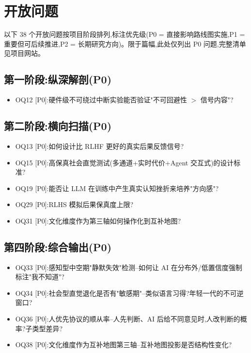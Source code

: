 \documentclass[11pt,a4paper]{article}
\begin{document}
\section{开放问题}

以下 38 个开放问题按项目阶段排列,标注优先级(P0 = 直接影响路线图实施,P1 = 重要但可后续推进,P2 = 长期研究方向)。限于篇幅,此处仅列出 P0 问题,完整清单见项目网站。

\subsection*{第一阶段:纵深解剖(P0)}

\begin{itemize}
  \item OQ12 [P0]:硬件级不可绕过中断实验能否验证"不可回避性 $>$ 信号内容"?
\end{itemize}

\subsection*{第二阶段:横向扫描(P0)}

\begin{itemize}
  \item OQ13 [P0]:如何设计比 RLHF 更好的真实后果反馈信号?
  \item OQ15 [P0]:高保真社会直觉测试(多通道+实时代价+Agent 交互式)的设计标准?
  \item OQ19 [P0]:能否让 LLM 在训练中产生真实认知挫折来培养"方向感"?
  \item OQ29 [P0]:RLHS 模拟后果保真度上限?
  \item OQ31 [P0]:文化维度作为第三轴如何操作化到互补地图?
\end{itemize}

\subsection*{第四阶段:综合输出(P0)}

\begin{itemize}
  \item OQ33 [P0]:感知型中空期"静默失效"检测--如何让 AI 在分布外/低置信度强制标注"我不知道"?
  \item OQ34 [P0]:社会型直觉退化是否有"敏感期"--类似语言习得?年轻一代的不可逆窗口?
  \item OQ36 [P0]:人优先协议的顺从率--人先判断、AI 后给不同意见时,人改判断的概率?子类型差异?
  \item OQ38 [P0]:文化维度作为互补地图第三轴--互补地图投影是否结构性变化?
\end{itemize}
\end{document}
